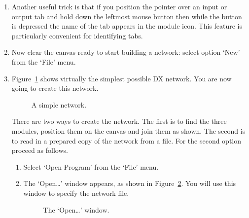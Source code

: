 \begin{enumerate}
  \item Another useful trick is that if you position the pointer over
   an input or output tab and hold down the leftmost mouse button then
   while the button is depressed the name of the tab appears in the
   module icon. This feature is particularly convenient for identifying
   tabs.

  \item Now clear the canvas ready to start building a network: select
   option `New' from the `File' menu.

  \item Figure~\ref{SIMPLE} shows virtually the simplest possible DX
   network. You are now going to create this network.

  \begin{figure}[htbp]

  \begin{center}
  \leavevmode
  \epsfxsize=139pt
  \end{center}

  \caption[A simple network.]{A simple network. \label{SIMPLE} }
  
  \end{figure}

   There are two ways to create the network. The first is to find the
   three modules, position them on the canvas and join them as shown.
   The second is to read in a prepared copy of the network from a file.
   For the second option proceed as follows.

  \begin{enumerate}

    \item Select `Open Program' from the `File' menu.

    \item The `Open\ldots' window appears, as shown in
     Figure~\ref{OPEN}. You will use this window to specify the network
     file.

    \newpage
    \begin{figure}[htbp]

    \begin{center}
    \leavevmode
    \epsfxsize=450pt
    \end{center}

    \caption[The `Open\ldots' window.]{The `Open\ldots' window.
    \label{OPEN} }
    

    \end{figure}


\end{enumerate}
\end{enumerate}

